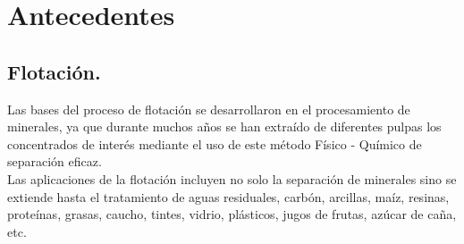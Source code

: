 \documentclass[11pt,letter
								]
								{article}
\begin{document}
%
%
%
%
%
%
%
%
%
%
%
%

\section{Antecedentes}
			\subsection{Flotación.}


			

Las bases  del proceso de flotación se desarrollaron en el procesamiento de minerales, ya que durante muchos años se han extraído de diferentes pulpas los concentrados de interés   mediante el uso de este método Físico - Químico  de separación eficaz.\cite{1} \\

Las  aplicaciones de la flotación incluyen no solo la separación de minerales sino se extiende hasta   el tratamiento de aguas residuales, carbón, arcillas, maíz, resinas, proteínas, grasas, caucho, tintes, vidrio, plásticos, jugos de frutas, azúcar de caña, etc.\cite{2}
\end{document}
